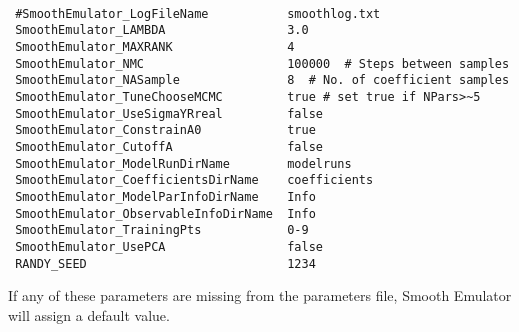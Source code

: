 \documentclass[main.tex]{subfiles}
\begin{document}
{\tt
\begin{verbatim}
 #SmoothEmulator_LogFileName           smoothlog.txt
 SmoothEmulator_LAMBDA                 3.0
 SmoothEmulator_MAXRANK                4
 SmoothEmulator_NMC                    100000  # Steps between samples 
 SmoothEmulator_NASample               8  # No. of coefficient samples
 SmoothEmulator_TuneChooseMCMC         true # set true if NPars>~5
 SmoothEmulator_UseSigmaYRreal         false 
 SmoothEmulator_ConstrainA0            true
 SmoothEmulator_CutoffA                false
 SmoothEmulator_ModelRunDirName        modelruns
 SmoothEmulator_CoefficientsDirName    coefficients
 SmoothEmulator_ModelParInfoDirName    Info
 SmoothEmulator_ObservableInfoDirName  Info
 SmoothEmulator_TrainingPts            0-9
 SmoothEmulator_UsePCA                 false
 RANDY_SEED                            1234
\end{verbatim}
}
If any of these parameters are missing from the parameters file, Smooth Emulator will assign a default value.
\end{document}
